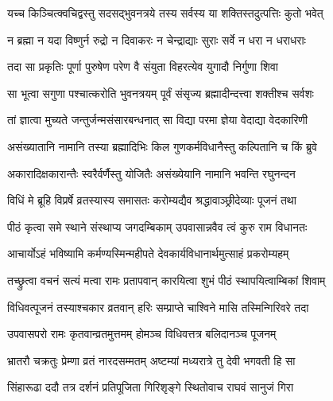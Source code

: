 \twolineshloka
{यच्च किञ्चित्क्वचिद्वस्तु सदसद्‌भुवनत्रये}
{तस्य सर्वस्य या शक्तिस्तदुत्पत्तिः कुतो भवेत्}%

\twolineshloka
{न ब्रह्मा न यदा विष्णुर्न रुद्रो न दिवाकरः}
{न चेन्द्राद्याः सुराः सर्वे न धरा न धराधराः}%

\twolineshloka
{तदा सा प्रकृतिः पूर्णा पुरुषेण परेण वै}
{संयुता विहरत्येव युगादौ निर्गुणा शिवा}%

\twolineshloka
{सा भूत्वा सगुणा पश्चात्करोति भुवनत्रयम्}
{पूर्वं संसृज्य ब्रह्मादीन्दत्त्वा शक्तीश्च सर्वशः}%

\twolineshloka
{तां ज्ञात्वा मुच्यते जन्तुर्जन्मसंसारबन्धनात्}
{सा विद्या परमा ज्ञेया वेदाद्या वेदकारिणी}%

\twolineshloka
{असंख्यातानि नामानि तस्या ब्रह्मादिभिः किल}
{गुणकर्मविधानैस्तु कल्पितानि च किं ब्रुवे}%

\twolineshloka
{अकारादिक्षकारान्तैः स्वरैर्वर्णैस्तु योजितैः}
{असंख्येयानि नामानि भवन्ति रघुनन्दन}%




\twolineshloka
{विधिं मे ब्रूहि विप्रर्षे व्रतस्यास्य समासतः}
{करोम्यद्यैव श्रद्धावाञ्छ्रीदेव्याः पूजनं तथा}%



\twolineshloka
{पीठं कृत्वा समे स्थाने संस्थाप्य जगदम्बिकाम्}
{उपवासान्नवैव त्वं कुरु राम विधानतः}%

\twolineshloka
{आचार्योऽहं भविष्यामि कर्मण्यस्मिन्महीपते}
{देवकार्यविधानार्थमुत्साहं प्रकरोम्यहम्}%



\twolineshloka
{तच्छ्रुत्वा वचनं सत्यं मत्वा रामः प्रतापवान्}
{कारयित्वा शुभं पीठं स्थापयित्वाम्बिकां शिवाम्}%

\twolineshloka
{विधिवत्पूजनं तस्याश्चकार व्रतवान् हरिः}
{सम्प्राप्ते चाश्विने मासि तस्मिन्गिरिवरे तदा}%

\twolineshloka
{उपवासपरो रामः कृतवान्व्रतमुत्तमम्}
{होमञ्च विधिवत्तत्र बलिदानञ्च पूजनम्}%

\twolineshloka
{भ्रातरौ चक्रतुः प्रेम्णा व्रतं नारदसम्मतम्}
{अष्टम्यां मध्यरात्रे तु देवी भगवती हि सा}%

\twolineshloka
{सिंहारूढा ददौ तत्र दर्शनं प्रतिपूजिता}
{गिरिशृङ्गे स्थितोवाच राघवं सानुजं गिरा}%



